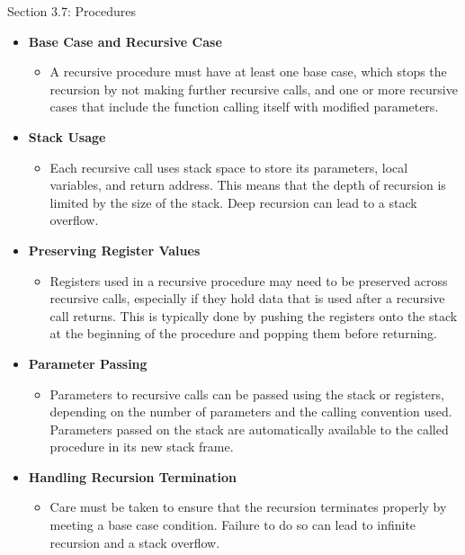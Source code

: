 \begin{notes}{Section 3.7: Procedures}
    \begin{itemize}
        \item \textbf{Base Case and Recursive Case}
        \begin{itemize}
            \item A recursive procedure must have at least one base case, which stops the recursion by not making further recursive calls, and one or more recursive cases that include the function 
            calling itself with modified parameters.
        \end{itemize}
        \item \textbf{Stack Usage}
        \begin{itemize}
            \item Each recursive call uses stack space to store its parameters, local variables, and return address. This means that the depth of recursion is limited by the size of the stack. Deep 
            recursion can lead to a stack overflow.
        \end{itemize}
        \item \textbf{Preserving Register Values}
        \begin{itemize}
            \item Registers used in a recursive procedure may need to be preserved across recursive calls, especially if they hold data that is used after a recursive call returns. This is typically 
            done by pushing the registers onto the stack at the beginning of the procedure and popping them before returning.
        \end{itemize}
        \item \textbf{Parameter Passing}
        \begin{itemize}
            \item Parameters to recursive calls can be passed using the stack or registers, depending on the number of parameters and the calling convention used. Parameters passed on the stack are 
            automatically available to the called procedure in its new stack frame.
        \end{itemize}
        \item \textbf{Handling Recursion Termination}
        \begin{itemize}
            \item Care must be taken to ensure that the recursion terminates properly by meeting a base case condition. Failure to do so can lead to infinite recursion and a stack overflow.
        \end{itemize}
    \end{itemize}
    

\end{notes}
